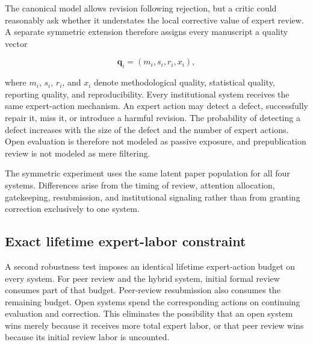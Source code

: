 The canonical model allows revision following rejection, but a critic could reasonably ask whether it understates the local corrective value of expert review. A separate symmetric extension therefore assigns every manuscript a quality vector

\begin{equation}
\mathbf{q}_i=(m_i,s_i,r_i,x_i),
\end{equation}

where $m_i$, $s_i$, $r_i$, and $x_i$ denote methodological quality, statistical quality, reporting quality, and reproducibility. Every institutional system receives the same expert-action mechanism. An expert action may detect a defect, successfully repair it, miss it, or introduce a harmful revision. The probability of detecting a defect increases with the size of the defect and the number of expert actions. Open evaluation is therefore not modeled as passive exposure, and prepublication review is not modeled as mere filtering.

The symmetric experiment uses the same latent paper population for all four systems. Differences arise from the timing of review, attention allocation, gatekeeping, resubmission, and institutional signaling rather than from granting correction exclusively to one system.

\subsection{Exact lifetime expert-labor constraint}

A second robustness test imposes an identical lifetime expert-action budget on every system. For peer review and the hybrid system, initial formal review consumes part of that budget. Peer-review resubmission also consumes the remaining budget. Open systems spend the corresponding actions on continuing evaluation and correction. This eliminates the possibility that an open system wins merely because it receives more total expert labor, or that peer review wins because its initial review labor is uncounted.
